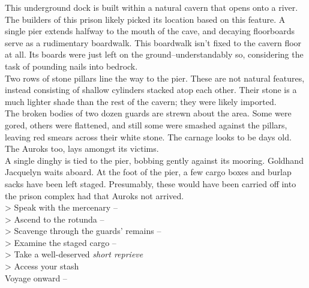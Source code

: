 This underground dock is built within a natural cavern that opens onto a river. The builders of this prison likely picked its location based on this feature. A single pier extends halfway to the mouth of the cave, and decaying floorboards serve as a rudimentary boardwalk. This boardwalk isn’t fixed to the cavern floor at all. Its boards were just left on the ground--understandably so, considering the task of pounding nails into bedrock.\\

Two rows of stone pillars line the way to the pier. These are not natural features, instead consisting of shallow cylinders stacked atop each other. Their stone is a much lighter shade than the rest of the cavern; they were likely imported.\\

The broken bodies of two dozen guards are strewn about the area. Some were gored, others were flattened, and still some were smashed against the pillars, leaving red smears across their white stone. The carnage looks to be days old. The Auroks too, lays amongst its victims.\\

A single dinghy is tied to the pier, bobbing gently against its mooring. Goldhand Jacquelyn waits aboard. At the foot of the pier, a few cargo boxes and burlap sacks have been left staged. Presumably, these would have been carried off into the prison complex had that Auroks not arrived.\\

> Speak with the mercenary -- \\
> Ascend to the rotunda -- \\
> Scavenge through the guards’ remains -- \\
> Examine the staged cargo -- \\
> Take a well-deserved \emph{short reprieve}\\
> Access your stash\\
 Voyage onward -- 